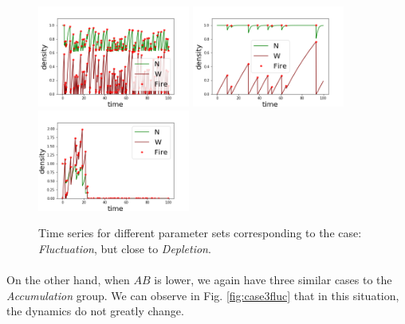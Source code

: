 \documentclass{article}
\begin{document}
\begin{figure}[h!]
\centering
\includegraphics[width=5cm]{equivalent_high_1.png}
\includegraphics[width=5cm]{equivalent_high_3.png} \\
\includegraphics[width=5cm]{equivalent_high_2.png}
\caption{Time series for different parameter sets corresponding to the case: \textit{Fluctuation}, but close to \textit{Depletion}.}
\label{fig:casefbyd}
\end{figure}

\newpage
\paragraph{}
On the other hand, when $AB$ is lower, we again have three similar cases to the \textit{Accumulation} group. We can observe in Fig. \ref{fig:case3fluc} that in this situation, the dynamics do not greatly change.%

\end{document}
